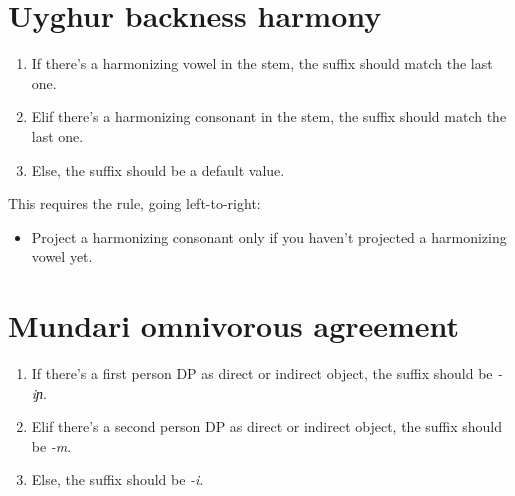 
\begin{abstract}
\textbf{Background:} Mayer and Major 2018 found that Uyghur backness harmony was not Tier-based Strictly Local, but instead Output-TSL.

\textbf{Claim:} Omnivorous Agreement in Mundari shows a similar pattern, and is also not TSL, but instead OTSL.

\textbf{Thrust:} Harmony/agreement patterns must be OTSL and not TSL if you have a hierarchy of more than two levels.

no rock paper scissors
\end{abstract}

\section*{Uyghur backness harmony}

\begin{enumerate}
  \item If there's a harmonizing vowel in the stem, the suffix should match the last one.
  \item Elif there's a harmonizing consonant in the stem, the suffix should match the last one.
  \item Else, the suffix should be a default value.
\end{enumerate}

This requires the rule, going left-to-right:

\begin{itemize}
  \item Project a harmonizing consonant only if you haven't projected a harmonizing vowel yet.
\end{itemize}

\section*{Mundari omnivorous agreement}

\begin{enumerate}
  \item If there's a first person DP as direct or indirect object, the suffix should be \textit{-iɲ}.
  \item Elif there's a second person DP as direct or indirect object, the suffix should be \textit{-m}.
  \item Else, the suffix should be \textit{-i}.
\end{enumerate}

